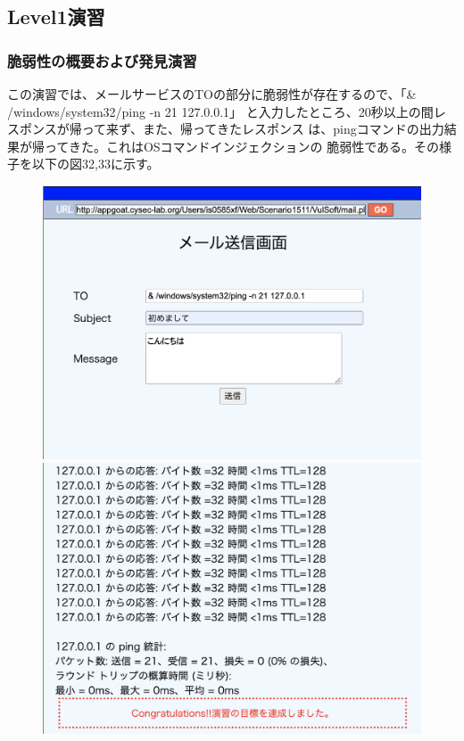 \documentclass[dvipdfmx,autodetect-engine,titlepage]{jsarticle}
\begin{document}
\subsection{Level1演習}

\subsubsection*{脆弱性の概要および発見演習}
この演習では、メールサービスのTOの部分に脆弱性が存在するので、「\& /windows/system32/ping -n 21 127.0.0.1」
と入力したところ、20秒以上の間レスポンスが帰って来ず、また、帰ってきたレスポンス
は、pingコマンドの出力結果が帰ってきた。これはOSコマンドインジェクションの
脆弱性である。その様子を以下の図32,33に示す。

\begin{figure}[h]
  \centering
  \begin{minipage}[b]{0.45\linewidth}
  \begin{center}
    \includegraphics[keepaspectratio,scale=0.3]{pic31.png}
    \end{center}
    \caption{}
  \end{minipage}
  \begin{minipage}[b]{0.45\linewidth}
  \begin{center}
    \includegraphics[keepaspectratio,scale=0.35]{pic32.png}
    \end{center}
    \caption{}
  \end{minipage}
\end{figure}
\end{document}
